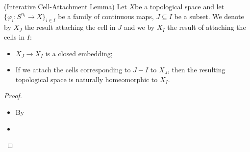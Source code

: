 \documentclass[Total.tex]{subfiles}
\begin{document}
	\begin{lemma}
		(Interative Cell-Attachment Lemma) Let $X$be a topological space and let $\{\varphi_i:S^{n_i}\rightarrow X\}_{i\in I}$ be a family of continuous maps, $J\subseteq I$ be a subset. We denote by $X_J$ the result attaching the cell in $J$ and we by $X_I$ the result of attaching the cells in $I$:
		\begin{itemize}
			\item $X_J\rightarrow X_I$ is a closed embedding;
			\item If we attach the cells corresponding to $J-I$ to $X_J$, then the resulting topological space is naturally homeomorphic to $X_I$.
		\end{itemize}
	\end{lemma}
	\begin{proof}
		\begin{itemize}
			\item By 
			\item 
		\end{itemize}
	\end{proof}
\end{document}
